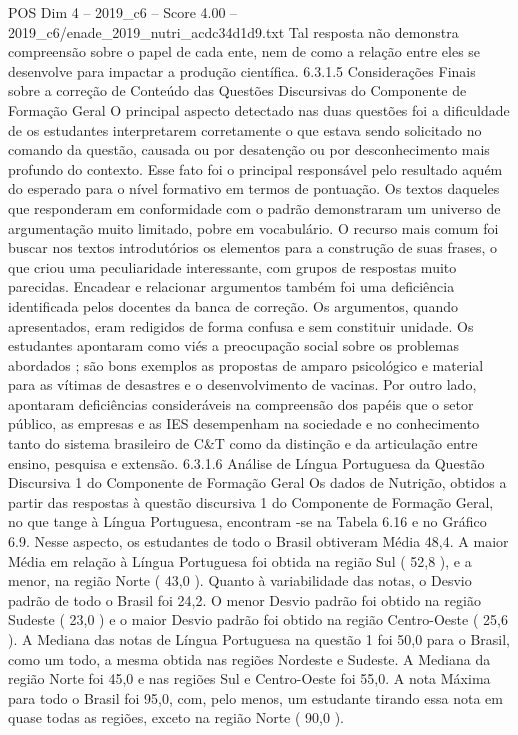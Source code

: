 \begin{textsample}{POS Dim 4 – 2019\_c6 – Score 4.00 – 2019\_c6/enade\_2019\_nutri\_acdc34d1d9.txt}
Tal resposta não demonstra compreensão sobre o papel de cada ente, nem de como a relação entre eles se desenvolve para impactar a produção científica. 6.3.1.5 Considerações Finais sobre a correção de Conteúdo das Questões Discursivas do Componente de Formação Geral O principal aspecto detectado nas duas questões foi a dificuldade de os estudantes interpretarem corretamente o que estava sendo solicitado no comando da questão, causada ou por desatenção ou por desconhecimento mais profundo do contexto.
Esse fato foi o principal responsável pelo resultado aquém do esperado para o nível formativo em termos de pontuação.
Os textos daqueles que responderam em conformidade com o padrão demonstraram um universo de argumentação muito limitado, pobre em vocabulário.
O recurso mais comum foi buscar nos textos introdutórios os elementos para a construção de suas frases, o que criou uma peculiaridade interessante, com grupos de respostas muito parecidas.
Encadear e relacionar argumentos também foi uma deficiência identificada pelos docentes da banca de correção.
Os argumentos, quando apresentados, eram redigidos de forma confusa e sem constituir unidade.
Os estudantes apontaram como viés a preocupação social sobre os problemas abordados ; são bons exemplos as propostas de amparo psicológico e material para as vítimas de desastres e o desenvolvimento de vacinas.
Por outro lado, apontaram deficiências consideráveis na compreensão dos papéis que o setor público, as empresas e as IES desempenham na sociedade e no conhecimento tanto do sistema brasileiro de C\&T como da distinção e da articulação entre ensino, pesquisa e extensão. 6.3.1.6 Análise de Língua Portuguesa da Questão Discursiva 1 do Componente de Formação Geral Os dados de Nutrição, obtidos a partir das respostas à questão discursiva 1 do Componente de Formação Geral, no que tange à Língua Portuguesa, encontram -se na Tabela 6.16 e no Gráfico 6.9.
Nesse aspecto, os estudantes de todo o Brasil obtiveram Média 48,4.
A maior Média em relação à Língua Portuguesa foi obtida na região Sul ( 52,8 ), e a menor, na região Norte ( 43,0 ).
Quanto à variabilidade das notas, o Desvio padrão de todo o Brasil foi 24,2.
O menor Desvio padrão foi obtido na região Sudeste ( 23,0 ) e o maior Desvio padrão foi obtido na região Centro-Oeste ( 25,6 ).
A Mediana das notas de Língua Portuguesa na questão 1 foi 50,0 para o Brasil, como um todo, a mesma obtida nas regiões Nordeste e Sudeste.
A Mediana da região Norte foi 45,0 e nas regiões Sul e Centro-Oeste foi 55,0.
A nota Máxima para todo o Brasil foi 95,0, com, pelo menos, um estudante tirando essa nota em quase todas as regiões, exceto na região Norte ( 90,0 ).

\end{textsample}
